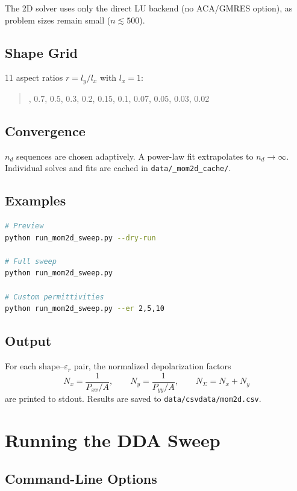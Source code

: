 \documentclass[a4paper,11pt]{article}
\begin{document}
The 2D solver uses only the direct LU backend (no ACA/GMRES option), as
problem sizes remain small ($n \lesssim 500$).

\subsection{Shape Grid}

11 aspect ratios $r = l_y / l_x$ with $l_x = 1$:
%
\begin{quote}
, 0.7, 0.5, 0.3, 0.2, 0.15, 0.1, 0.07, 0.05, 0.03, 0.02
\end{quote}

\subsection{Convergence}

$n_d$ sequences are chosen adaptively.  A power-law fit extrapolates to
$n_d \to \infty$.  Individual solves and fits are cached in
\texttt{data/\_mom2d\_cache/}.

\subsection{Examples}

\begin{lstlisting}[language=bash]
# Preview
python run_mom2d_sweep.py --dry-run

# Full sweep
python run_mom2d_sweep.py

# Custom permittivities
python run_mom2d_sweep.py --er 2,5,10
\end{lstlisting}

\subsection{Output}

For each shape--$\varepsilon_r$ pair, the normalized depolarization factors
\[
N_x = \frac{1}{P_{xx}/A}, \qquad
N_y = \frac{1}{P_{yy}/A}, \qquad
N_{\Sigma} = N_x + N_y
\]
are printed to stdout.  Results are saved to
\texttt{data/csvdata/mom2d.csv}.

\section{Running the DDA Sweep}

\subsection{Command-Line Options}
\end{document}
